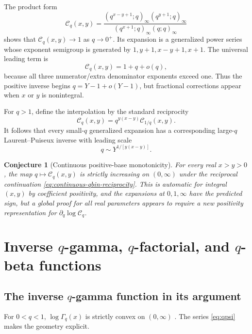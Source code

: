 \documentclass[11pt,a4paper,oneside,openany]{book}
\newtheorem{conjecture}[theorem]{Conjecture}
\theoremstyle{definition}
\theoremstyle{remark}
\begin{document}
The product form
\begin{equation}\label{eq:continuous-qbin-product}
 \mathcal C_q(x,y)=
 \frac{(q^{x-y+1};q)_\infty(q^{y+1};q)_\infty}
 {(q^{x+1};q)_\infty(q;q)_\infty}
\end{equation}
shows that \(\mathcal C_q(x,y)\to1\) as \(q\to0^+\).  Its expansion is a
generalized power series whose exponent semigroup is generated by
\(1,y+1,x-y+1,x+1\).  The universal leading term is
\[
 \mathcal C_q(x,y)=1+q+o(q),
\]
because all three numerator/extra denominator exponents exceed one.  Thus
the positive inverse begins \(q=Y-1+o(Y-1)\), but fractional corrections
appear when \(x\) or \(y\) is nonintegral.

For \(q>1\), define the interpolation by the standard reciprocity
\begin{equation}\label{eq:continuous-qbin-reciprocity}
 \mathcal C_q(x,y)=q^{y(x-y)}\mathcal C_{1/q}(x,y).
\end{equation}
It follows that every small-\(q\) generalized expansion has a corresponding
large-\(q\) Laurent--Puiseux inverse with leading scale
\[
 q\sim Y^{1/[y(x-y)]}.
\]

\begin{conjecture}[Continuous positive-base monotonicity]\label{conj:continuous-qbin-monotone}
For every real \(x>y>0\), the map
\(q\mapsto\mathcal C_q(x,y)\) is strictly increasing on \((0,\infty)\)
under the reciprocal continuation \eqref{eq:continuous-qbin-reciprocity}.
This is automatic for integral \((x,y)\) by coefficient positivity, and the
expansions at \(0,1,\infty\) have the predicted sign, but a global proof for
all real parameters appears to require a new positivity representation for
\(\partial_q\log\mathcal C_q\).
\end{conjecture}

\chapter{Inverse \texorpdfstring{$q$}{q}-gamma, \texorpdfstring{$q$}{q}-factorial, and \texorpdfstring{$q$}{q}-beta functions}

\section{The inverse \texorpdfstring{$q$}{q}-gamma function in its argument}

For \(0<q<1\), \(\log\Gamma_q(x)\) is strictly convex on \((0,\infty)\)
\cite{DLMFqGamma,AndrewsAskeyRoy}.  The series \eqref{eq:qpsi} makes the
geometry explicit.
\end{document}
